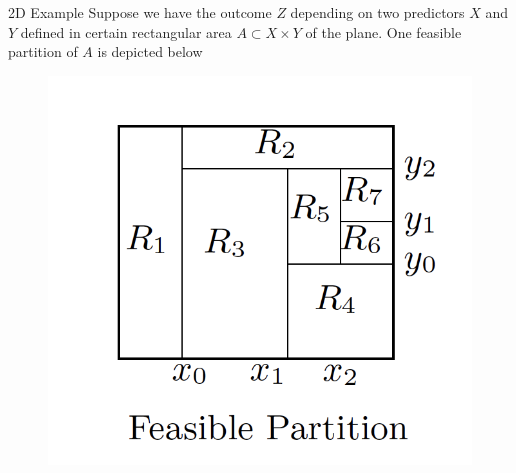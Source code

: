 \documentclass{beamer}
\begin{document}
\begin{frame}{2D Example}
	Suppose we have the outcome $Z$ depending on two predictors $X$ and $Y$ defined in certain rectangular area $A\subset X \times Y$ of the plane. One feasible partition of $A$ is depicted below
		\begin{figure}[h]
		\centering
		\includegraphics[scale=0.5]{../../Figures/fig_tree_region.png}
	\end{figure}
	
\end{frame}
\end{document}
